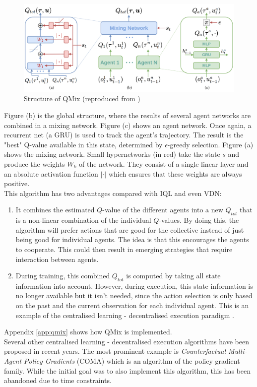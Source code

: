 \begin{figure}[htp]
    \centering
    \includegraphics[width=16cm]{images/qmix_structure.png}
    \caption{Structure of QMix (reproduced from \cite{rashid2018qmix})}
    \label{fig:qmix_structure}
\end{figure}

Figure (b) is the global structure, where the results of several agent networks are combined in a mixing network. Figure (c) shows an agent network. Once again, a recurrent net (a GRU) is used to track the agent's trajectory. The result is the "best" Q-value available in this state, determined by $\epsilon$-greedy selection. Figure (a) shows the mixing network. Small hypernetworks (in red) take the state $s$ and produce the weights $W_k$ of the network. They consist of a single linear layer and an absolute activation function $|\cdot|$ which ensures that these weights are always positive.\\
This algorithm has two advantages compared with IQL and even VDN:
\begin{enumerate}
    \item It combines the estimated $Q$-value of the different agents into a new $Q_{tot}$ that is a non-linear combination of the individual $Q$-values. By doing this, the algorithm will prefer actions that are good for the collective instead of just being good for individual agents. The idea is that this encourages the agents to cooperate. This could then result in emerging strategies that require interaction between agents.
    \item During training, this combined $Q_{tot}$ is computed by taking all state information into account. However, during execution, this state information is no longer available but it isn't needed, since the action selection is only based on the past and the current observation for each individual agent. This is an example of the centralised learning - decentralised execution paradigm \cite{oliehoek2008optimal}.
\end{enumerate}
Appendix \ref{app:qmix} shows how QMix is implemented.\\
Several other centralised learning - decentralised execution algorithms have been proposed in recent years. The most prominent example is \emph{Counterfactual Multi-Agent Policy Gradients} (COMA) \cite{foerster2018counterfactual} which is an algorithm of the policy gradient family. While the initial goal was to also implement this algorithm, this has been abandoned due to time constraints.

